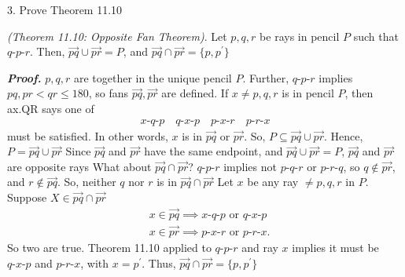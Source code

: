 \documentclass{report}
\begin{document}
    \bigbreak \noindent 
    \begin{mdframed}
        3. Prove Theorem 11.10
    \end{mdframed}
    \bigbreak \noindent 
    \begin{remark}
       \textit{(Theorem 11.10: Opposite Fan Theorem)}. Let $p,q,r$ be rays in pencil $P$ such that $ q\text{-}p\text{-}r$. Then, $ \overrightarrow{pq} \cup \overrightarrow{pr} = P$, and $ \overrightarrow{pq} \cap \overrightarrow{pr} = \{p,p^{\prime}\} $
    \end{remark}
    \bigbreak \noindent 
    \textbf{\textit{Proof.}} $ p,q,r$ are together in the unique pencil $P$. Further, $ q\text{-}p\text{-}r$ implies $pq, pr< qr \leq 180 $, so fans $\overrightarrow{pq}, \overrightarrow{pr}$ are defined.
    \bigbreak \noindent 
    If $x \ne p,q,r$ is in pencil $P$, then ax.QR says one of 
    \begin{align*}
        x\text{-}q\text{-}p \quad q\text{-}x\text{-}p \quad p\text{-}x\text{-}r \quad p\text{-}r\text{-}x
    \end{align*}
    must be satisfied. In other words, $x$ is in $\overrightarrow{pq}$ or $\overrightarrow{pr}$. So, $P \subseteq \overrightarrow{pq} \cup \overrightarrow{pr} $. Hence, $P = \overrightarrow{pq} \cup \overrightarrow{pr} $
    \bigbreak \noindent 
    Since $\overrightarrow{pq}$ and $\overrightarrow{pr}$ have the same endpoint, and $ \overrightarrow{pq} \cup \overrightarrow{pr} = P$, $\overrightarrow{pq}$ and $\overrightarrow{pr}$ are opposite rays
    \bigbreak \noindent 
    What about $\overrightarrow{pq} \cap \overrightarrow{pr}$? $ q\text{-}p\text{-}r$ implies not $ p\text{-}q\text{-}r$ or $ p\text{-}r\text{-}q $, so $ q \not\in \overrightarrow{pr}$, and $ r \not\in \overrightarrow{pq}$. So, neither $q$ nor $r$ is in $\overrightarrow{pq} \cap \overrightarrow{pr}$
    \bigbreak \noindent 
    Let $x$ be any ray $\ne p,q,r$ in $P$. Suppose $X \in \overrightarrow{pq} \cap \overrightarrow{pr}$
    \begin{align*}
        &x \in \overrightarrow{pq} \implies x\text{-}q\text{-}p \text{ or } q\text{-}x\text{-}p \\
        &x \in \overrightarrow{pr} \implies p\text{-}x\text{-}r \text{ or } p\text{-}r\text{-}x
    .\end{align*}
    So two are true. Theorem 11.10 applied to $ q\text{-}p\text{-}r$ and ray $x$ implies it must be $ q\text{-}x\text{-}p$ and $ p\text{-}r\text{-}x$, with $ x = p^{\prime}$. Thus, $\overrightarrow{pq} \cap \overrightarrow{pr} = \{p,p^{\prime}\} $ \endpf
    
\end{document}
